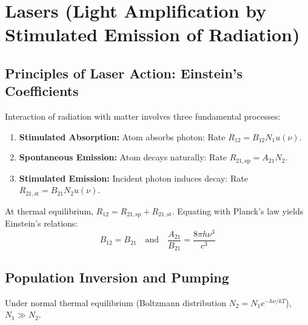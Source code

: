 \documentclass[12pt,a4paper]{article}
\begin{document}
\section{Lasers (Light Amplification by Stimulated Emission of Radiation)}

\subsection{Principles of Laser Action: Einstein's Coefficients}

Interaction of radiation with matter involves three fundamental processes:

\begin{tcolorbox}[formulabox, title={\textbf{Three Radiation Processes and Einstein's Relations}}]
\begin{enumerate}[leftmargin=*, itemsep=3pt]
  \item \textbf{Stimulated Absorption:} Atom absorbs photon: Rate $R_{12} = B_{12} N_1 u(\nu)$.
  \item \textbf{Spontaneous Emission:} Atom decays naturally: Rate $R_{21,\text{sp}} = A_{21} N_2$.
  \item \textbf{Stimulated Emission:} Incident photon induces decay: Rate $R_{21,\text{st}} = B_{21} N_2 u(\nu)$.
\end{enumerate}
At thermal equilibrium, $R_{12} = R_{21,\text{sp}} + R_{21,\text{st}}$. Equating with Planck's law yields Einstein's relations:
\begin{equation}
B_{12} = B_{21} \quad \text{and} \quad \frac{A_{21}}{B_{21}} = \frac{8\pi h \nu^3}{c^3}
\end{equation}
\end{tcolorbox}

\subsection{Population Inversion and Pumping}

Under normal thermal equilibrium (Boltzmann distribution $N_2 = N_1 e^{-h\nu/kT}$), $N_1 \gg N_2$.
\end{document}
